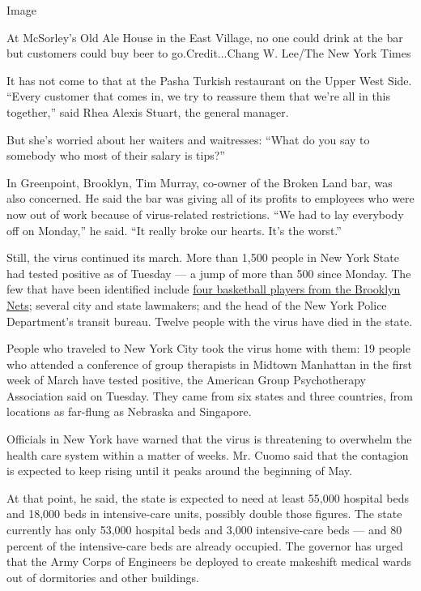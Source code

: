 Image

At McSorley's Old Ale House in the East Village, no one could drink at
the bar but customers could buy beer to go.Credit...Chang W. Lee/The New
York Times

It has not come to that at the Pasha Turkish restaurant on the Upper
West Side. ``Every customer that comes in, we try to reassure them that
we're all in this together,'' said Rhea Alexis Stuart, the general
manager.

But she's worried about her waiters and waitresses: ``What do you say to
somebody who most of their salary is tips?''

In Greenpoint, Brooklyn, Tim Murray, co-owner of the Broken Land bar,
was also concerned. He said the bar was giving all of its profits to
employees who were now out of work because of virus-related
restrictions. ``We had to lay everybody off on Monday,'' he said. ``It
really broke our hearts. It's the worst.''

Still, the virus continued its march. More than 1,500 people in New York
State had tested positive as of Tuesday --- a jump of more than 500
since Monday. The few that have been identified include
\href{https://www.nytimes.com/2020/03/17/sports/brooklyn-nets-coronavirus.html}{four
basketball players from the Brooklyn Nets}; several city and state
lawmakers; and the head of the New York Police Department's transit
bureau. Twelve people with the virus have died in the state.

People who traveled to New York City took the virus home with them: 19
people who attended a conference of group therapists in Midtown
Manhattan in the first week of March have tested positive, the American
Group Psychotherapy Association said on Tuesday. They came from six
states and three countries, from locations as far-flung as Nebraska and
Singapore.

Officials in New York have warned that the virus is threatening to
overwhelm the health care system within a matter of weeks. Mr. Cuomo
said that the contagion is expected to keep rising until it peaks around
the beginning of May.

At that point, he said, the state is expected to need at least 55,000
hospital beds and 18,000 beds in intensive-care units, possibly double
those figures. The state currently has only 53,000 hospital beds and
3,000 intensive-care beds --- and 80 percent of the intensive-care beds
are already occupied. The governor has urged that the Army Corps of
Engineers be deployed to create makeshift medical wards out of
dormitories and other buildings.


